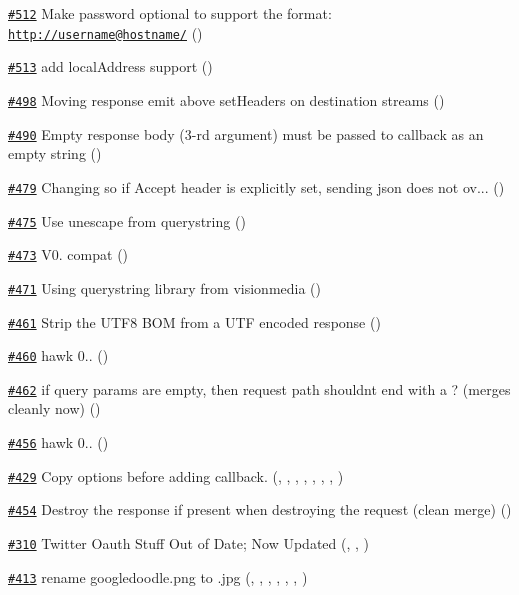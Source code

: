 \begin{DoxyItemize}
\item \href{https://github.com/request/request/pull/512}{\tt \#512} Make password optional to support the format\+: \href{http://username@hostname/}{\tt http\+://username@hostname/} ()
\item \href{https://github.com/request/request/pull/513}{\tt \#513} add \textquotesingle{}local\+Address\textquotesingle{} support ()
\item \href{https://github.com/request/request/pull/498}{\tt \#498} Moving response emit above set\+Headers on destination streams ()
\item \href{https://github.com/request/request/pull/490}{\tt \#490} Empty response body (3-\/rd argument) must be passed to callback as an empty string ()
\item \href{https://github.com/request/request/pull/479}{\tt \#479} Changing so if Accept header is explicitly set, sending json does not ov... ()
\item \href{https://github.com/request/request/pull/475}{\tt \#475} Use {\ttfamily unescape} from {\ttfamily querystring} ()
\item \href{https://github.com/request/request/pull/473}{\tt \#473} V0. compat ()
\item \href{https://github.com/request/request/pull/471}{\tt \#471} Using querystring library from visionmedia ()
\item \href{https://github.com/request/request/pull/461}{\tt \#461} Strip the U\+T\+F8 B\+OM from a U\+TF encoded response ()
\item \href{https://github.com/request/request/pull/460}{\tt \#460} hawk 0.. ()
\item \href{https://github.com/request/request/pull/462}{\tt \#462} if query params are empty, then request path shouldn\textquotesingle{}t end with a \textquotesingle{}?\textquotesingle{} (merges cleanly now) ()
\item \href{https://github.com/request/request/pull/456}{\tt \#456} hawk 0.. ()
\item \href{https://github.com/request/request/pull/429}{\tt \#429} Copy options before adding callback. (, , , , , , , )
\item \href{https://github.com/request/request/pull/454}{\tt \#454} Destroy the response if present when destroying the request (clean merge) ()
\item \href{https://github.com/request/request/pull/310}{\tt \#310} Twitter Oauth Stuff Out of Date; Now Updated (, , )
\item \href{https://github.com/request/request/pull/413}{\tt \#413} rename googledoodle.\+png to .jpg (, , , , , , )

\end{DoxyItemize}
